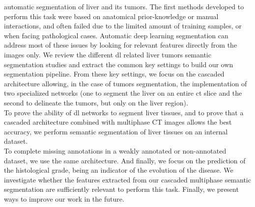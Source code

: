automatic segmentation of liver and its tumors.
The first methods developed to perform this task were based on
anatomical prior-knowledge or manual interactions, and often failed due to 
the limited amount of training samples, or when
facing pathological cases.
Automatic deep learning segmentation can address most of these issues by
looking for relevant features directly from the images only.
We review the different \ac{dl} related liver tumors semantic segmentation
studies and extract the common key settings to build our own segmentation pipeline.
From these key settings, we focus on the cascaded architecture allowing,
in the case of tumors segmentation, the implementation of two specialized
networks (one to segment the liver on an entire \ac{ct} slice and the second to delineate the
tumors, but only on the liver region).\\
To prove the ability of \ac{dl} networks to segment liver tissues, and to
prove that a cascaded architecture combined with multiphase CT images
allows the best accuracy, we perform semantic segmentation of liver
tissues on an internal dataset.\\
To complete missing annotations in a weakly annotated or non-annotated
dataset, we use the same architecture.
And finally, we focus on the prediction of the histological grade, being
an indicator of the evolution of the disease. We investigate whether the
features extracted from our cascaded multiphase semantic segmentation
are sufficiently relevant to perform this task. 
Finally, we present ways to improve our work in the future.
